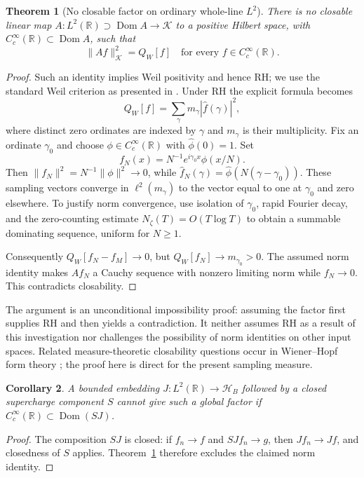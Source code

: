 \documentclass[11pt]{article}
\numberwithin{equation}{section}
\newtheorem{theorem}{Theorem}[section]
\newtheorem{corollary}[theorem]{Corollary}
\theoremstyle{definition}
\theoremstyle{remark}
\newcommand{\R}{\mathbb R}
\newcommand{\HH}{\mathcal H}
\newcommand{\norm}[1]{\lVert#1\rVert}
\DeclareMathOperator{\Dom}{Dom}
\begin{document}
\begin{theorem}[No closable factor on ordinary whole-line $L^2$]
\label{thm:global}
There is no closable linear map $A:L^2(\R)\supset\Dom A\to\mathcal K$
to a positive Hilbert space, with $C_c^\infty(\R)\subset\Dom A$, such that
\begin{equation}
\norm{Af}_{\mathcal K}^2=Q_W[f]
\quad\text{for every }f\in C_c^\infty(\R).
\end{equation}
\end{theorem}
\begin{proof}
Such an identity implies Weil positivity and hence RH; we use the standard
Weil criterion as presented in \cite{SuzukiHilbert,SuzukiScrew}.
Under RH the explicit formula becomes
\begin{equation}
Q_W[f]=\sum_\gamma m_\gamma|\widehat f(\gamma)|^2,
\label{eq:sampling}
\end{equation}
where distinct zero ordinates are indexed by $\gamma$ and $m_\gamma$
is their multiplicity. Fix an ordinate $\gamma_0$ and choose
$\phi\in C_c^\infty(\R)$ with $\widehat\phi(0)=1$. Set
\begin{equation}
f_N(x)=N^{-1}e^{i\gamma_0x}\phi(x/N).
\end{equation}
Then $\norm{f_N}^2=N^{-1}\norm\phi^2\to0$, while
$\widehat f_N(\gamma)=\widehat\phi(N(\gamma-\gamma_0))$.
These sampling vectors converge in $\ell^2(m_\gamma)$ to the vector
equal to one at $\gamma_0$ and zero elsewhere. To justify norm
convergence, use isolation of $\gamma_0$, rapid Fourier decay, and the
zero-counting estimate $N_\zeta(T)=O(T\log T)$ to obtain a summable
dominating sequence, uniform for $N\geq1$.

Consequently $Q_W[f_N-f_M]\to0$, but $Q_W[f_N]\to m_{\gamma_0}>0$.
The assumed norm identity makes $Af_N$ a Cauchy sequence with nonzero
limiting norm while $f_N\to0$. This contradicts closability.
\end{proof}

The argument is an unconditional impossibility proof: assuming the factor
first supplies RH and then yields a contradiction. It neither assumes RH
as a result of this investigation nor challenges the possibility of norm
identities on other input spaces. Related measure-theoretic closability
questions occur in Wiener--Hopf form theory \cite{Yafaev}; the proof here
is direct for the present sampling measure.

\begin{corollary}
A bounded embedding $J:L^2(\R)\to\HH_B$ followed by a closed supercharge
component $S$ cannot give such a global factor if
$C_c^\infty(\R)\subset\Dom(SJ)$.
\end{corollary}
\begin{proof}
The composition $SJ$ is closed: if $f_n\to f$ and $SJf_n\to g$, then
$Jf_n\to Jf$, and closedness of $S$ applies. Theorem~\ref{thm:global}
therefore excludes the claimed norm identity.
\end{proof}
\end{document}
